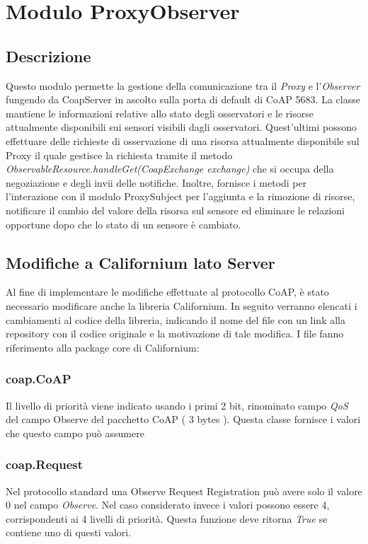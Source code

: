 \chapter{Modulo ProxyObserver}
	\section {Descrizione}
		Questo modulo permette la gestione della comunicazione tra il \textit{Proxy} e l'\textit{Observer} fungendo da CoapServer in ascolto sulla porta di default di CoAP 5683. La classe mantiene le informazioni relative allo stato degli osservatori e le risorse attualmente disponibili sui sensori visibili dagli osservatori. Quest'ultimi possono effettuare delle richieste di osservazione di una risorsa attualmente disponibile sul Proxy il quale gestisce la richiesta tramite il metodo \textit{ObservableResource.handleGet(CoapExchange exchange)} che si occupa della negoziazione e degli invii delle notifiche. \newline
		Inoltre, fornisce i metodi per l'interazione con il modulo ProxySubject per l'aggiunta e la rimozione di risorse, notificare il cambio del valore della risorsa sul sensore ed eliminare le relazioni opportune dopo che lo stato di un sensore è cambiato.
	\section {Modifiche a Californium lato Server}
			Al fine di implementare le modifiche effettuate al protocollo CoAP, è stato necessario modificare anche la libreria Californium. In seguito verranno elencati i cambiamenti al codice della libreria, indicando il nome del file con un link alla repository con il codice originale e la motivazione di tale modifica. I file fanno riferimento alla package core di Californium:
			\subsection{coap.CoAP}
				Il livello di priorità viene indicato usando i primi 2 bit, rinominato campo \textit{QoS} del campo Observe del pacchetto CoAP ( 3 bytes ).  Questa classe fornisce i valori che questo campo può assumere\newline
				

			\subsection{coap.Request}
				Nel protocollo standard una Observe Request Registration può avere solo il valore 0 nel campo \textit{Observe}. Nel caso considerato invece i valori possono essere 4, corrispondenti ai 4 livelli di priorità. Questa funzione deve ritorna \textit{True} se 	contiene uno di questi valori. \newline
				

